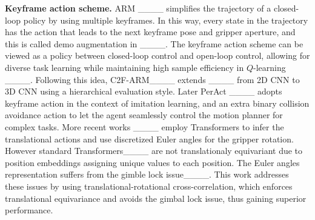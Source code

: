 \textbf{Keyframe action scheme.}
ARM ____ simplifies the trajectory of a closed-loop policy by using multiple keyframes. In this way, every state in the trajectory has the action that leads to the next keyframe pose and gripper aperture, and this is called demo augmentation in ____. The keyframe action scheme can be viewed as a policy between closed-loop control and open-loop control, allowing for diverse task learning while maintaining high sample efficiency in $Q$-learning ____. Following this idea, C2F-ARM____ extends ____ from 2D CNN to 3D CNN using a hierarchical evaluation style.
Later PerAct ____ adopts keyframe action in the context of imitation learning, and an extra binary collision avoidance action to let the agent seamlessly control the motion planner for complex tasks. 
More recent works ____ employ Transformers to infer the translational actions and use discretized Euler angles for the gripper rotation. However standard Transformers____ are not translationaly equivariant due to position embeddings assigning unique values to each position. The Euler angles representation suffers from the gimble lock issue____. This work addresses these issues by using translational-rotational cross-correlation, which enforces translational equivariance and avoids the gimbal lock issue, thus gaining superior performance.

